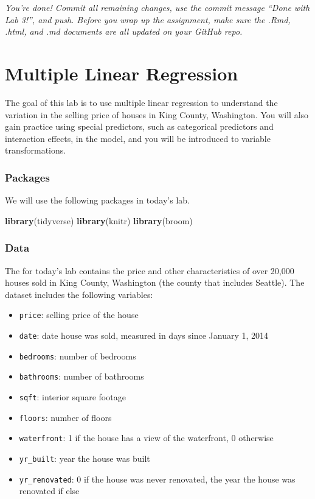 \documentclass[]{book}
\newenvironment{Shaded}{\begin{snugshade}}{\end{snugshade}}
\newcommand{\KeywordTok}[1]{\textcolor[rgb]{0.13,0.29,0.53}{\textbf{#1}}}
\newcommand{\NormalTok}[1]{#1}
\providecommand{\tightlist}{%
  \setlength{\itemsep}{0pt}\setlength{\parskip}{0pt}}
\begin{document}
\emph{You're done! Commit all remaining changes, use the commit message
``Done with Lab 3!'', and push. Before you wrap up the assignment, make
sure the .Rmd, .html, and .md documents are all updated on your GitHub
repo.}

\chapter{Multiple Linear Regression}\label{mlr}

The goal of this lab is to use multiple linear regression to understand
the variation in the selling price of houses in King County, Washington.
You will also gain practice using special predictors, such as
categorical predictors and interaction effects, in the model, and you
will be introduced to variable transformations.

\subsection{Packages}\label{packages-3}

We will use the following packages in today's lab.

\begin{Shaded}
\begin{Highlighting}[]
\KeywordTok{library}\NormalTok{(tidyverse)}
\KeywordTok{library}\NormalTok{(knitr)}
\KeywordTok{library}\NormalTok{(broom)}
\end{Highlighting}
\end{Shaded}

\subsection{Data}\label{data-3}

The for today's lab contains the price and other characteristics of over
20,000 houses sold in King County, Washington (the county that includes
Seattle). The dataset includes the following variables:

\begin{itemize}
\tightlist
\item
  \texttt{price}: selling price of the house
\item
  \texttt{date}: date house was sold, measured in days since January 1,
  2014
\item
  \texttt{bedrooms}: number of bedrooms
\item
  \texttt{bathrooms}: number of bathrooms
\item
  \texttt{sqft}: interior square footage
\item
  \texttt{floors}: number of floors
\item
  \texttt{waterfront}: 1 if the house has a view of the waterfront, 0
  otherwise
\item
  \texttt{yr\_built}: year the house was built
\item
  \texttt{yr\_renovated}: 0 if the house was never renovated, the year
  the house was renovated if else
\end{itemize}
\end{document}
